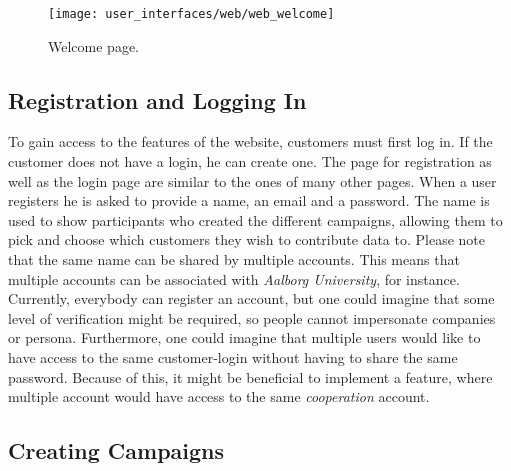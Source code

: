 \begin{figure}[!htbp]
\centering
\texttt{[image: user\_interfaces/web/web\_welcome]}
\caption{Welcome page.}
\label{fig:web_welcome}
\end{figure}
\FloatBarrier

\subsection{Registration and Logging In}

To gain access to the features of the website, customers must first log in. If the customer does not have a login, he can create one. The page for registration as well as the login page are similar to the ones of many other pages. When a user registers he is asked to provide a name, an email and a password. The name is used to show participants who created the different campaigns, allowing them to pick and choose which customers they wish to contribute data to. Please note that the same name can be shared by multiple accounts. This means that multiple accounts can be associated with \emph{Aalborg University}, for instance. Currently, everybody can register an account, but one could imagine that some level of verification might be required, so people cannot impersonate companies or persona. Furthermore, one could imagine that multiple users would like to have access to the same customer-login without having to share the same password. Because of this, it might be beneficial to implement a feature, where multiple account would have access to the same \emph{cooperation} account.



\subsection{Creating Campaigns}
\label{sub:creating_campaign}

